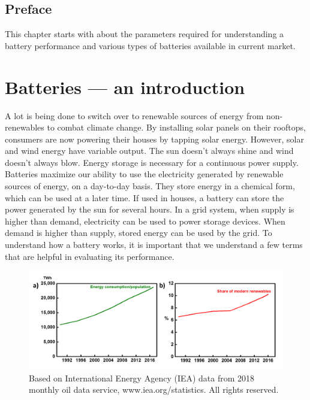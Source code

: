 \section*{Preface}
This chapter starts with  about the parameters required for understanding a battery performance and various types of batteries available in current market.
\pagebreak
\chapter{Batteries --- an introduction} %
 \label{chap1} %
\newcommand{\keyword}[1]{\textbf{#1}}
\newcommand{\tabhead}[1]{\textbf{#1}}
\newcommand{\code}[1]{\texttt{#1}}
\newcommand{\file}[1]{\texttt{\bfseries#1}}
\newcommand{\option}[1]{\texttt{\itshape#1}}

A lot is being done to switch over to renewable sources of energy from non-renewables to combat climate change. By installing solar panels on their rooftops, consumers are now powering their houses by tapping solar energy. However, solar and wind energy have variable output. The sun doesn't always shine and wind doesn't always blow. Energy storage is necessary for a continuous power supply. Batteries maximize our ability to use the electricity generated by renewable sources of energy, on a day-to-day basis. They store energy in a chemical form, which can be used at a later time. If used in houses, a battery can store the power generated by the sun for several hours. In a grid system, when supply is higher than demand, electricity can be used to power storage devices. When demand is higher than supply, stored energy can be used by the grid. To understand how a battery works, it is important that we understand a few terms that are helpful in evaluating its performance. 

\begin{figure}[tbh!]
\centering
\includegraphics[width=\textwidth]{Figures/chap1fig/IEC2}
\caption{Based on International Energy Agency (IEA) data from 2018 monthly oil data service, www.iea.org/statistics. All rights reserved.}
\label{Figures/chap1fig:IEC2}
\end{figure}

